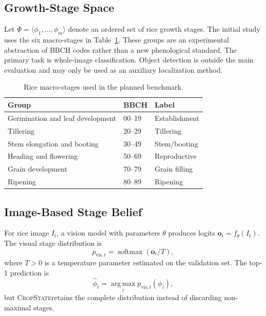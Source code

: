 \documentclass[conference]{IEEEtran}
\newcommand{\method}{\textsc{CropState}}
\newcommand{\softmax}{\operatorname{softmax}}
\newcommand{\argmaxop}{\operatorname*{arg\,max}}
\begin{document}
\subsection{Growth-Stage Space}
Let $\Phi=\langle\phi_1,\ldots,\phi_m\rangle$ denote an ordered set of rice growth stages. The initial study uses the six macro-stages in Table~\ref{tab:stages}. These groups are an experimental abstraction of BBCH codes rather than a new phenological standard. The primary task is whole-image classification. Object detection is outside the main evaluation and may only be used as an auxiliary localization method.

\begin{table}[t]
\caption{Rice macro-stages used in the planned benchmark.}
\label{tab:stages}
\centering
\footnotesize
\begin{tabular}{p{}p{}p{}}
\toprule
Group & BBCH & Label \\
\midrule
Germination and leaf development & 00--19 & Establishment \\
Tillering & 20--29 & Tillering \\
Stem elongation and booting & 30--49 & Stem/booting \\
Heading and flowering & 50--69 & Reproductive \\
Grain development & 70--79 & Grain filling \\
Ripening & 80--89 & Ripening \\
\bottomrule
\end{tabular}
\end{table}

\subsection{Image-Based Stage Belief}
For rice image $I_t$, a vision model with parameters $\theta$ produces logits $\mathbf{o}_t=f_{\theta}(I_t)$. The visual stage distribution is
\begin{equation}
p_{\mathrm{vis},t}=\softmax(\mathbf{o}_t/T),
\end{equation}
where $T>0$ is a temperature parameter estimated on the validation set. The top-1 prediction is
\begin{equation}
\widehat{\phi}_t=\argmaxop_i p_{\mathrm{vis},t}(\phi_i),
\end{equation}
but \method retains the complete distribution instead of discarding non-maximal stages.
\end{document}
